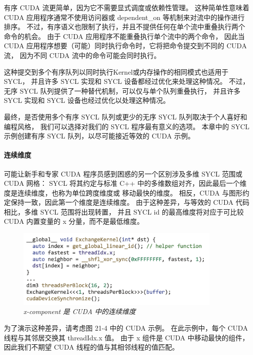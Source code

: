 有序 CUDA 流更简单，因为它不需要显式调度或依赖性管理。 
这种简单性意味着 CUDA 应用程序通常不使用访问器或 dependent\_on 等机制来对流中的操作进行排序。 
不过，有序语义也限制了执行，并且不提供任何在单个流中重叠执行两个命令的机会。 
由于 CUDA 应用程序不能重叠执行单个流中的两个命令，
因此当 CUDA 应用程序想要（可能）同时执行命令时，它将把命令提交到不同的 CUDA 流，
因为不同 CUDA 流中的命令可能会同时执行。

这种提交到多个有序队列以同时执行Kernel或内存操作的相同模式也适用于 SYCL，
并且许多 SYCL 实现和 SYCL 设备都经过优化来处理这种情况。 
不过，无序 SYCL 队列提供了一种替代机制，可以仅与单个队列重叠执行，
并且许多 SYCL 实现和 SYCL 设备也经过优化以处理这种情况。

最终，是否使用多个有序 SYCL 队列或更少的无序 SYCL 队列取决于个人喜好和编程风格，
我们可以选择对我们的 SYCL 程序最有意义的选项。 
本章中的 SYCL 示例创建有序 SYCL 队列，以尽可能接近等效的 CUDA 示例。

\paragraph{连续维度}

可能让新手和专家 CUDA 程序员感到困惑的另一个区别涉及多维 SYCL 范围或 CUDA 网格：
SYCL 将其约定与标准 C++ 中的多维数组对齐，因此最后一个维度是连续维度，也称为单位跨度维度或 移动最快的维度。 
相反，CUDA 与图形约定保持一致，因此第一个维度是连续维度。 
由于这种差异，与等效的 CUDA 代码相比，多维 SYCL 范围将出现转置，
并且 SYCL id 的最高维度将对应于可比较 CUDA 内置变量的 x 分量，而不是最低维度。

\begin{figure}[H]
	\centering
	\includegraphics[width=0.9\textwidth]{figs/F21.4.png}
	\caption{\textit{x-component 是 CUDA 中的连续维度 }}
\end{figure}

为了演示这种差异，请考虑图 21-4 中的 CUDA 示例。 
在此示例中，每个 CUDA 线程与其邻居交换其 threadIdx.x 值。 
由于 x 组件是 CUDA 中移动最快的组件，因此我们不期望 CUDA 线程的值与其相邻线程的值匹配。

